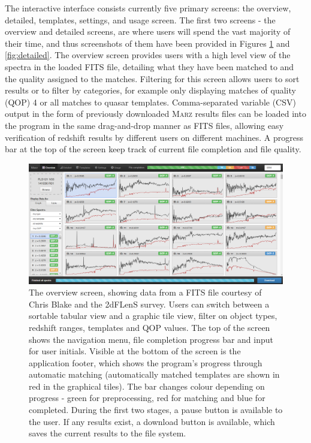 \documentclass[iop]{emulateapj}
\newcommand{\marz}{\textsc{Marz}}
\begin{document}
The interactive interface consists currently five primary screens: the overview, detailed, templates, settings, and usage screen. The first two screens - the overview and detailed screens, are where users will spend the vast majority of their time, and thus screenshots of them have been provided in Figures \ref{fig:overview} and \ref{fig:detailed}. The overview screen provides users with a high level view of the spectra in the loaded FITS file, detailing what they have been matched to and the quality assigned to the matches. Filtering for this screen allows users to sort results or to filter by categories, for example only displaying matches of quality (QOP) 4 or all matches to quasar templates. Comma-separated variable (CSV) output in the form of previously downloaded \marz{} results files can be loaded into the program in the same drag-and-drop manner as FITS files, allowing easy verification of redshift results by different users on different machines. A progress bar at the top of the screen keep track of current file completion and file quality.\\



\begin{figure}[H]
\centering
\includegraphics[width=\textwidth]{InterfaceZ.png}
\caption{The overview screen, showing data from a FITS file courtesy of Chris Blake and the 2dFLenS survey. Users can switch between a sortable tabular view and a graphic tile view, filter on object types, redshift ranges, templates and QOP values. The top of the screen shows the navigation menu, file completion progress bar and input for user initials. Visible at the bottom of the screen is the application footer, which shows the program's progress through automatic matching (automatically matched templates are shown in red in the graphical tiles). The bar changes colour depending on progress - green for preprocessing, red for matching and blue for completed. During the first two stages, a pause button is available to the user. If any results exist, a download button is available, which saves the current results to the file system.}
\label{fig:overview}
\end{figure}
\end{document}
